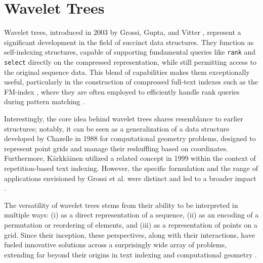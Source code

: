 \clearpage
\section{Wavelet Trees} \label{sec:wavelet_trees}

Wavelet trees, introduced in 2003 by Grossi, Gupta, and Vitter \cite{GrossiWT2003}, represent a significant development in the field of succinct data structures. They function as self-indexing structures, capable of supporting fundamental queries like \texttt{rank} and \texttt{select} directly on the compressed representation, while still permitting access to the original sequence data. This blend of capabilities makes them exceptionally useful, particularly in the construction of compressed full-text indexes such as the FM-index \cite{ferragina2000opportunistic}, where they are often employed to efficiently handle rank queries during pattern matching \cite{WTForALL}.

Interestingly, the core idea behind wavelet trees shares resemblance to earlier structures; notably, it can be seen as a generalization of a data structure developed by Chazelle in 1988 \cite{Chazelle1988} for computational geometry problems, designed to represent point grids and manage their reshuffling based on coordinates. Furthermore, Kärkkäinen utilized a related concept in 1999 \cite{karkkainen1999repetition} within the context of repetition-based text indexing. However, the specific formulation and the range of applications envisioned by Grossi et al. were distinct and led to a broader impact \cite{WTForALL}.

The versatility of wavelet trees stems from their ability to be interpreted in multiple ways: (i) as a direct representation of a sequence, (ii) as an encoding of a permutation or reordering of elements, and (iii) as a representation of points on a grid. Since their inception, these perspectives, along with their interactions, have fueled innovative solutions across a surprisingly wide array of problems, extending far beyond their origins in text indexing and computational geometry \cite{WTForALL, WTFromTheoryToPractice, TheMyriadVirtuesWT}.

